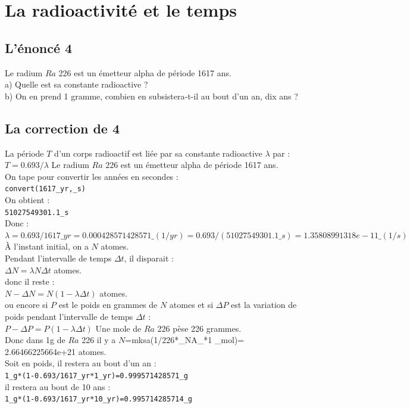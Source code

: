 \documentclass[a4paper,11pt]{book}
\begin{document}
\section{La radioactivit\'e et le temps}
\subsection{L'\'enonc\'e 4}
Le radium $Ra$ 226 est un \'emetteur alpha de p\'eriode 1617 ans.\\
a) Quelle est sa constante radioactive ?\\
b) On en prend 1 gramme, combien en subsistera-t-il au bout d'un an, dix ans ?
\subsection{La correction de 4}
La p\'eriode $T$ d'un corps radioactif est li\'ee par sa constante radioactive 
$\lambda$ par :\\
$T=0.693/\lambda$
Le radium $Ra$ 226 est un \'emetteur alpha de p\'eriode 1617 ans.\\
On tape pour convertir les ann\'ees en secondes :\\
{\tt convert(1617\_yr,\_s)}\\
On obtient :\\
{\tt 51027549301.1\_s}\\
Donc :\\
$\lambda=0.693/1617\_yr=0.000428571428571\_(1/yr)=0.693/(51027549301.1\_s)=1.35808991318e-11\_(1/s)$ \\
\`A l'instant initial, on a $N$ atomes.\\
Pendant l'intervalle de temps $\Delta t$, il disparait :\\
$\Delta N=\lambda N \Delta t$ atomes.\\
donc il reste :\\
$N-\Delta N=N(1-\lambda \Delta t)$ atomes.\\
ou encore si $P$ est le poids en grammes de $N$ atomes et si $\Delta P$ est la 
variation de poids pendant l'intervalle de temps $\Delta t$ :\\
$P-\Delta P=P(1-\lambda \Delta t)$
Une mole de $Ra$ 226 p\`ese 226 grammes.\\ 
Donc dans 1g de $Ra$ 226 il y a $N$=mksa(1/226*\_NA\_*1 \_mol)=
2.66466225664e+21 atomes.\\
Soit en poids, il restera au bout d'un an :\\
{\tt 1\_g*(1-0.693/1617\_yr*1\_yr)=0.999571428571\_g}\\
il restera au bout de 10 ans :\\ 
{\tt 1\_g*(1-0.693/1617\_yr*10\_yr)=0.995714285714\_g}
\end{document}
